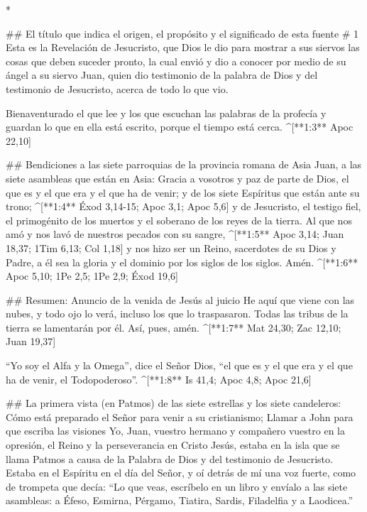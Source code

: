 \begin{paracols}{2}
\switchcolumn[0]*

## El título que indica el origen, el propósito y el significado de esta fuente
# 1
 Esta es la Revelación de Jesucristo, que Dios le dio para mostrar a sus siervos las cosas que deben suceder pronto, la cual envió y dio a conocer por medio de su ángel a su siervo Juan,  quien dio testimonio de la palabra de Dios y del testimonio de Jesucristo, acerca de todo lo que vio.

 Bienaventurado el que lee y los que escuchan las palabras de la profecía y guardan lo que en ella está escrito, porque el tiempo está cerca. ^[**1:3** Apoc 22,10]

## Bendiciones a las siete parroquias de la provincia romana de Asia
 Juan, a las siete asambleas que están en Asia: Gracia a vosotros y paz de parte de Dios, el que es y el que era y el que ha de venir; y de los siete Espíritus que están ante su trono; ^[**1:4** Éxod 3,14-15; Apoc 3,1; Apoc 5,6]  y de Jesucristo, el testigo fiel, el primogénito de los muertos y el soberano de los reyes de la tierra. Al que nos amó y nos lavó de nuestros pecados con su sangre, ^[**1:5** Apoc 3,14; Juan 18,37; 1Tim 6,13; Col 1,18]  y nos hizo ser un Reino, sacerdotes de su Dios y Padre, a él sea la gloria y el dominio por los siglos de los siglos. Amén. ^[**1:6** Apoc 5,10; 1Pe 2,5; 1Pe 2,9; Éxod 19,6]

## Resumen: Anuncio de la venida de Jesús al juicio
 He aquí que viene con las nubes, y todo ojo lo verá, incluso los que lo traspasaron. Todas las tribus de la tierra se lamentarán por él. Así, pues, amén. ^[**1:7** Mat 24,30; Zac 12,10; Juan 19,37]

 “Yo soy el Alfa y la Omega”, dice el Señor Dios, “el que es y el que era y el que ha de venir, el Todopoderoso”. ^[**1:8** Is 41,4; Apoc 4,8; Apoc 21,6]

## La primera vista (en Patmos) de las siete estrellas y los siete candeleros: Cómo está preparado el Señor para venir a su cristianismo; Llamar a John para que escriba las visiones
 Yo, Juan, vuestro hermano y compañero vuestro en la opresión, el Reino y la perseverancia en Cristo Jesús, estaba en la isla que se llama Patmos a causa de la Palabra de Dios y del testimonio de Jesucristo.  Estaba en el Espíritu en el día del Señor, y oí detrás de mí una voz fuerte, como de trompeta  que decía: “Lo que veas, escríbelo en un libro y envíalo a las siete asambleas: a Éfeso, Esmirna, Pérgamo, Tiatira, Sardis, Filadelfia y a Laodicea.”


\end{paracols}
